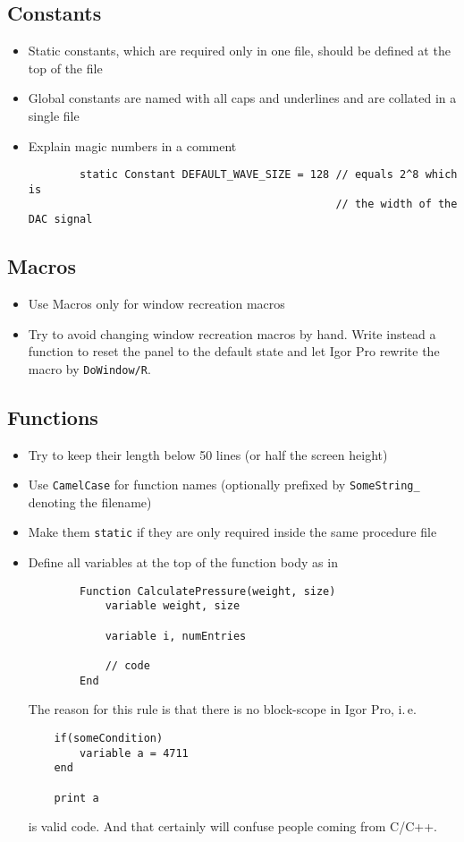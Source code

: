 \documentclass{scrartcl}
\begin{document}
\subsection{Constants}
%
\begin{itemize}
	\item Static constants, which are required only in one file, should be defined at the top of the file
%
	\item Global constants are named with all caps and underlines and are collated in a single file
%
	\item Explain magic numbers in a comment
	\begin{verbatim}
		static Constant DEFAULT_WAVE_SIZE = 128 // equals 2^8 which is
		                                        // the width of the DAC signal
	\end{verbatim}
\end{itemize}
%
\subsection{Macros}
\begin{itemize}
	\item Use Macros only for window recreation macros
%
	\item Try to avoid changing window recreation macros by hand. Write instead a function to reset the panel to
	      the default state and let Igor Pro rewrite the macro by \texttt{DoWindow/R}.
\end{itemize}
%
\subsection{Functions}
\begin{itemize}
	\item Try to keep their length below 50 lines (or half the screen height)
%
	\item Use \texttt{CamelCase} for function names (optionally prefixed by \texttt{SomeString_} denoting the filename)
%
	\item Make them \texttt{static} if they are only required inside the same procedure file
%
	\item Define all variables at the top of the function body as in
	\begin{verbatim}
		Function CalculatePressure(weight, size)
			variable weight, size

			variable i, numEntries

			// code
		End
	\end{verbatim}
	The reason for this rule is that there is no block-scope in Igor Pro, i.\,e.
	\begin{verbatim}
	if(someCondition)
		variable a = 4711
	end

	print a
	\end{verbatim}
	is valid code. And that certainly will confuse people coming from C/C++.
\end{itemize}
%
\end{document}
